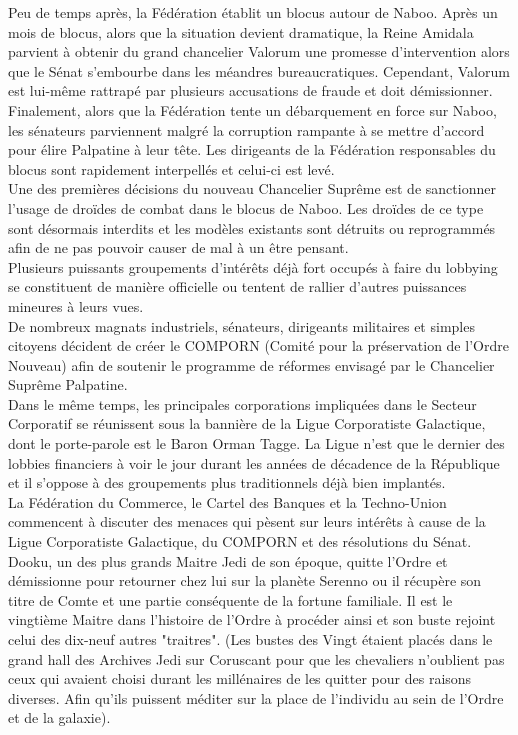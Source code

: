 \documentclass[twoside]{article}
\begin{document}
Peu de temps après, la Fédération établit un blocus autour de Naboo. Après un mois de blocus, alors que la situation devient dramatique, la Reine Amidala parvient à obtenir du grand chancelier Valorum une promesse d'intervention alors que le Sénat s'embourbe dans les méandres bureaucratiques. Cependant, Valorum est lui-même rattrapé par plusieurs accusations de fraude et doit démissionner. 
Finalement, alors que la Fédération tente un débarquement en force sur Naboo, les sénateurs parviennent malgré la corruption rampante à se mettre d'accord pour élire Palpatine à leur tête. Les dirigeants de la Fédération responsables du blocus sont rapidement interpellés et celui-ci est levé. \\

Une des premières décisions du nouveau Chancelier Suprême est de sanctionner l'usage de droïdes de combat dans le blocus de Naboo. Les droïdes de ce type sont désormais interdits et les modèles existants sont détruits ou reprogrammés afin de ne pas pouvoir causer de mal à un être pensant. \\

Plusieurs puissants groupements d'intérêts déjà fort occupés à faire du lobbying se constituent de manière officielle ou tentent de rallier d'autres puissances mineures à leurs vues. \\

De nombreux magnats industriels, sénateurs, dirigeants militaires et simples citoyens décident de créer le COMPORN (Comité pour la préservation de l'Ordre Nouveau) afin de soutenir le programme de réformes envisagé par le Chancelier Suprême Palpatine.  \\

Dans le même temps, les principales corporations impliquées dans le Secteur Corporatif se réunissent sous la bannière de la Ligue Corporatiste Galactique, dont le porte-parole est le Baron Orman Tagge. La Ligue n'est que le dernier des lobbies financiers à voir le jour durant les années de décadence de la République et il s'oppose à des groupements plus traditionnels déjà bien implantés. \\

La Fédération du Commerce, le Cartel des Banques et la Techno-Union commencent à discuter des menaces qui pèsent sur leurs intérêts à cause de la Ligue Corporatiste Galactique, du COMPORN et des résolutions du Sénat. \\

Dooku, un des plus grands Maitre Jedi de son époque, quitte l'Ordre et démissionne pour retourner chez lui sur la planète Serenno ou il récupère son titre de Comte et une partie conséquente de la fortune familiale. Il est le vingtième Maitre dans l'histoire de l'Ordre à procéder ainsi et son buste rejoint celui des dix-neuf autres "traitres". (Les bustes des Vingt étaient placés dans le grand hall des Archives Jedi sur Coruscant pour que les chevaliers n'oublient pas ceux qui avaient choisi durant les millénaires de les quitter pour des raisons diverses. Afin qu'ils puissent méditer sur la place de l'individu au sein de l'Ordre et de la galaxie). 
\end{document}
